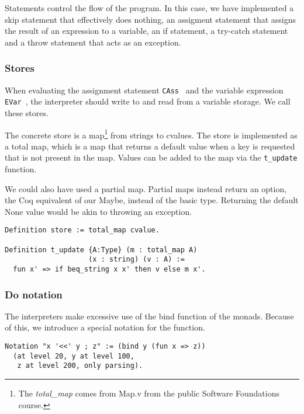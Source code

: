 Statements control the flow of the program. In this case, we have implemented a
skip statement that effectively does nothing, an assigment statement that
assigns the result of an expression to a variable, an if statement, a try-catch
statement and a throw statement that acts as an exception.

\subsubsection{Stores}\label{sec:stores}
When evaluating the assignment statement \texttt{CAss } and the variable
expression \texttt{EVar }, the interpreter should write to and read from a variable
storage. We call these stores. 

The concrete store is a map\footnote{The \textit{total\_map} comes from 
	Map.v from the public Software Foundations course.} 
from strings to cvalues. The store is implemented as a total map, which is a
map that returns a default value when a key is requested that is not present in
the map. Values can be added to the map via the \texttt{t_update }
function.

We could also have used a partial map. Partial maps instead return an option,
the Coq equivalent of our Maybe, instead of the basic type.
Returning the default None value would be akin to throwing an exception.

\begin{listing}
\begin{verbatim}
Definition store := total_map cvalue.

Definition t_update {A:Type} (m : total_map A)
                    (x : string) (v : A) :=
  fun x' => if beq_string x x' then v else m x'.

\end{verbatim}
\end{listing}

\subsubsection{Do notation}
The interpreters make excessive use of the bind function of the monads.
Because of this, we introduce a special notation for the function.

\begin{listing}
\begin{verbatim}
Notation "x '<<' y ; z" := (bind y (fun x => z))
  (at level 20, y at level 100, 
   z at level 200, only parsing).
\end{verbatim}
\end{listing}

